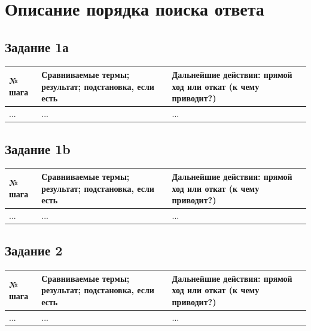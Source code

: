 \documentclass[12pt]{report}
\begin{document}
\section*{Описание порядка поиска ответа}

\subsection*{Задание 1а}

\begin{table}[H]
	\begin{center}
		\begin{tabular}{|p{1 cm}|p{9 cm}|p{9 cm}|}
			\hline
			№ шага & Сравниваемые термы; результат; подстановка, если есть & Дальнейшие действия: прямой ход или откат (к чему приводит?) \\
			\hline 
			... & ... & ... \\
			\hline
		\end{tabular}
	\end{center}
\end{table} 

\subsection*{Задание 1b}

\begin{table}[H]
	\begin{center}
		\begin{tabular}{|p{1 cm}|p{9 cm}|p{9 cm}|}
			\hline
			№ шага & Сравниваемые термы; результат; подстановка, если есть & Дальнейшие действия: прямой ход или откат (к чему приводит?) \\
			\hline 
			... & ... & ... \\
			\hline
		\end{tabular}
	\end{center}
\end{table} 

\subsection*{Задание 2}

\begin{table}[H]
	\begin{center}
		\begin{tabular}{|p{1 cm}|p{9 cm}|p{9 cm}|}
			\hline
			№ шага & Сравниваемые термы; результат; подстановка, если есть & Дальнейшие действия: прямой ход или откат (к чему приводит?) \\
			\hline 
			... & ... & ... \\
			\hline
		\end{tabular}
	\end{center}
\end{table} 
\end{document}
